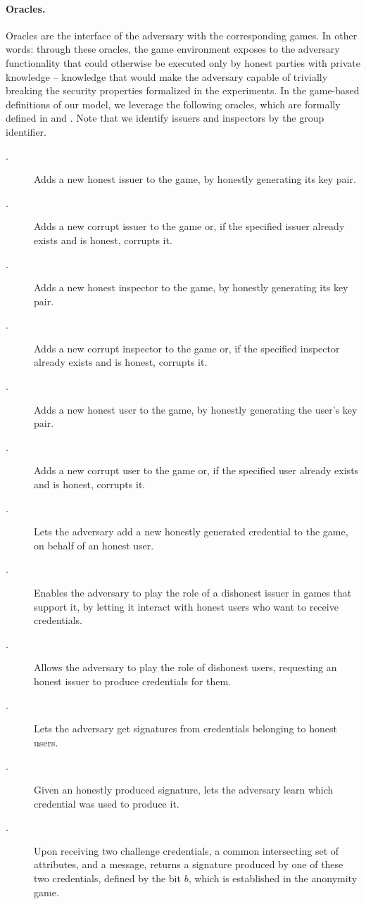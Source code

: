 \paragraph{Oracles.} %
Oracles are the interface of the adversary with the corresponding games. In
other words: through these oracles, the game environment exposes to the adversary
functionality that could otherwise be executed only by honest parties with
private knowledge -- knowledge that would make the adversary capable of
trivially breaking the security properties formalized in the experiments.
In the game-based definitions of our \GSAC model, we leverage the following
oracles, which are formally defined in  and
. Note that we identify issuers and inspectors by the group
identifier.

\begin{description}
\item[\HIGEN.] Adds a new honest issuer to the game, by honestly generating
  its key pair.
\item[\CIGEN.] Adds a new corrupt issuer to the game or, if the specified issuer
  already exists and is honest, corrupts it.
\item[\HOGEN.] Adds a new honest inspector to the game, by honestly generating
  its key pair.
\item[\COGEN.] Adds a new corrupt inspector to the game or, if the specified
  inspector already exists and is honest, corrupts it. 
\item[\HUGEN.] Adds a new honest user to the game, by honestly generating
  the user's key pair.
\item[\CUGEN.] Adds a new corrupt user to the game or, if the specified
  user already exists and is honest, corrupts it.
\item[\OBTISS.] Lets the adversary add a new honestly generated credential to
  the game, on behalf of an honest user.
\item[\OBTAIN.] Enables the adversary to play the role of a dishonest issuer
  in games that support it, by letting it interact with honest users who want to
  receive credentials.
\item[\ISSUE.] Allows the adversary to play the role of dishonest users,
  requesting an honest issuer to produce credentials for them.
\item[\SIGN.] Lets the adversary get signatures from credentials belonging
  to honest users.
\item[\OPEN.] Given an honestly produced signature, lets the adversary learn
  which credential was used to produce it.
\item[\CHALb.] Upon receiving two challenge credentials, a common intersecting
  set of attributes, and a message, returns a signature produced by one of these
  two credentials, defined by the bit $b$, which is established in the anonymity
  game.
\end{description}

